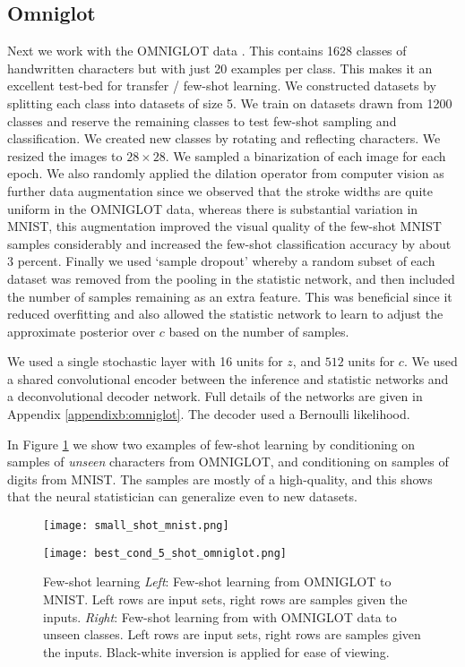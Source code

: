 \documentclass{article} \usepackage{iclr2017_conference,times}
\begin{document}
\subsection{Omniglot}
Next we work with the OMNIGLOT data \citep{omniglot}. This contains 1628 classes of handwritten characters but with just 20 examples per class. This makes it an excellent test-bed for transfer / few-shot learning. We constructed datasets by splitting each class into datasets of size 5. We train on datasets drawn from 1200 classes and reserve the remaining classes to test few-shot sampling and classification. We created new classes by rotating and reflecting characters. We resized the images to $28 \times 28$. We sampled a binarization of each image for each epoch. We also randomly applied the dilation operator from computer vision as further data augmentation since we observed that the stroke widths are quite uniform in the OMNIGLOT data, whereas there is substantial variation in MNIST, this augmentation improved the visual quality of the few-shot MNIST samples considerably and increased the few-shot classification accuracy by about $3$ percent. Finally we used `sample dropout' whereby a random subset of each dataset was removed from the pooling in the statistic network, and then included the number of samples remaining  as an extra feature. This was beneficial since it reduced overfitting and also allowed the statistic network to learn to adjust the approximate posterior over $c$ based on the number of samples.

We used a single stochastic layer with 16 units for $z$, and $512$ units for $c$. We used a shared convolutional encoder between the inference and statistic networks and a deconvolutional decoder network. Full details of the networks are given in Appendix \ref{appendixb:omniglot}. The decoder used a Bernoulli likelihood. 

In Figure \ref{fig:small_shot} we show two examples of few-shot learning by conditioning on samples of \emph{unseen} characters from OMNIGLOT, and conditioning on samples of digits from MNIST. The  samples are mostly of a high-quality, and this shows that the neural statistician can generalize even to new datasets. 

\begin{figure}
\begin{minipage}{0.5\textwidth}
\centering
\texttt{[image: small\_shot\_mnist.png]}
\end{minipage}
\begin{minipage}{0.5\textwidth}
\centering
\texttt{[image: best\_cond\_5\_shot\_omniglot.png]}
\end{minipage}
\caption{Few-shot learning \emph{Left}: Few-shot learning from OMNIGLOT to MNIST. Left rows are input sets, right rows are samples given the inputs. \emph{Right}: Few-shot learning from with OMNIGLOT data to unseen classes. Left rows are input sets, right rows are samples given the inputs. Black-white inversion is applied for ease of viewing. \label{fig:small_shot}}
\vspace{-1em}
\end{figure}
\end{document}
